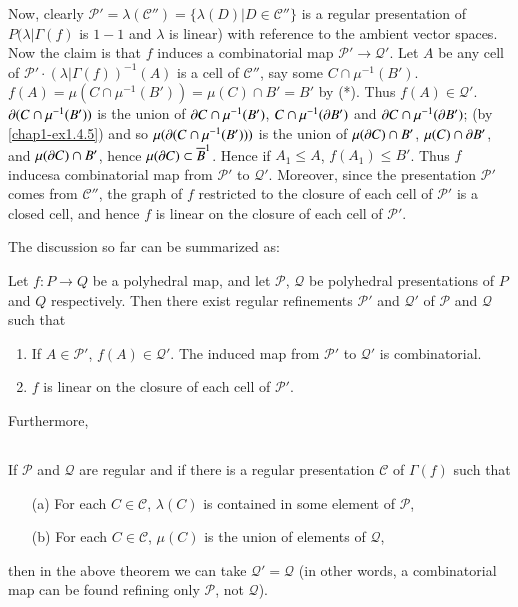 Now, clearly $\mathscr{P}'=\lambda(\mathscr{C}'')=\{\lambda(D)|D\in \mathscr{C}''\}$ is a regular presentation of $P(\lambda|\Gamma(f)$ is $1-1$ and $\lambda$ is linear) with reference to the ambient vector spaces. Now the claim is that $f$ induces a combinatorial map $\mathscr{P}'\to \mathcal{Q}'$. Let $A$ be any cell of $\mathscr{P}'\cdot (\lambda|\Gamma(f))^{-1}(A)$ is a cell of $\mathscr{C}''$, say some $C\cap \mu^{-1}(B')$. $f(A)=\mu(C\cap \mu^{-1}(B'))=\mu (C)\cap B'=B'$ by (*). Thus $f(A)\in \mathcal{Q}'$. $\partial (C\cap \mu^{-1}(B'))$ is the union of $\partial C\cap \mu^{-1}(B')$, $C\cap \mu^{-1}(\partial B')$ and $\partial C\cap \mu^{-1}(\partial B')$; (by \ref{chap1-ex1.4.5}) and so $\mu(\partial (C\cap \mu^{-1}(B')))$ is the union of $\mu(\partial C)\cap B'$, $\mu(C)\cap \partial B'$, and $\mu(\partial C)\cap B'$, hence $\mu(\partial C)\subset \overline{B}^{1}$. Hence if $A_{1}\leq A$, $f(A_{1})\leq B'$. Thus $f$ induces\pageoriginale a combinatorial map from $\mathscr{P}'$ to $\mathcal{Q}'$. Moreover, since the presentation $\mathscr{P}'$ comes from $\mathscr{C}''$, the graph of $f$ restricted to the closure of each cell of $\mathscr{P}'$ is a closed cell, and hence $f$ is linear on the closure of each cell of $\mathscr{P}'$.

The discussion so far can be summarized as:

\begin{theorem}\label{chap1-thm2.2.4}
Let $f:P\to Q$ be a polyhedral map, and let $\mathscr{P}$, $\mathcal{Q}$ be polyhedral presentations of $P$ and $Q$ respectively. Then there exist regular refinements $\mathscr{P}'$ and $\mathcal{Q}'$ of $\mathscr{P}$ and $\mathcal{Q}$ such that 
\begin{enumerate}
\renewcommand{\labelenumi}{(\theenumi)}
\item If $A\in \mathscr{P}'$, $f(A)\in \mathcal{Q}'$. The induced map from $\mathscr{P}'$ to $\mathcal{Q}'$ is combinatorial.

\item $f$ is linear on the closure of each cell of $\mathscr{P}'$.
\end{enumerate}
Furthermore,
\end{theorem}

\setcounter{subsection}{4}
\subsection{}\label{chap1-sec2.2.5} 
If $\mathscr{P}$ and $\mathcal{Q}$ are regular and if there is a regular presentation $\mathscr{C}$ of $\Gamma(f)$ such that
\begin{itemize}
\item[(a)] For each $C\in \mathscr{C}$, $\lambda(C)$ is contained in some element of $\mathscr{P}$,

\item[(b)] For each $C\in\mathscr{C}$, $\mu(C)$ is the union of elements of $\mathcal{Q}$,
\end{itemize}
\noindent
then in the above theorem we can take $\mathcal{Q}'=\mathcal{Q}$ (in other words, a combinatorial map can be found refining only $\mathscr{P}$, not $\mathcal{Q}$). 

